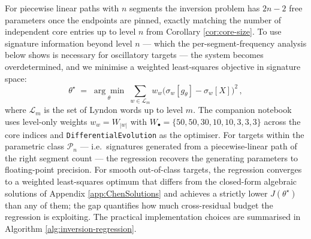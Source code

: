 \documentclass[12pt,english]{article}
\theoremstyle{remark}
\begin{document}
For piecewise linear paths with $n$ segments the inversion problem
has $2n-2$ free parameters once the endpoints are pinned, exactly
matching the number of independent core entries up to level $n$ from
Corollary \ref{cor:core-size}. To use signature information beyond
level $n$ --- which the per-segment-frequency analysis below shows
is necessary for oscillatory targets --- the system becomes overdetermined,
and we minimise a weighted least-squares objective in signature space:
\begin{equation}
\theta^{\star}\;=\;\underset{\theta}{\arg\min}\;\sum_{w\in\mathcal{L}_{m}}w_{w}\bigl(\sigma_{w}[g_{\theta}]-\sigma_{w}[X]\bigr)^{2}\,,\label{eq:weighted-regression}
\end{equation}
where $\mathcal{L}_{m}$ is the set of Lyndon words up to level $m$.
The companion notebook uses level-only weights $w_{w}=W_{|w|}$ with
$W_{\bullet}=\{50,50,30,10,10,3,3,3\}$ across the core indices and
\texttt{DifferentialEvolution} as the optimiser. For targets within
the parametric class $\mathcal{P}_{n}$ --- i.e.\ signatures generated
from a piecewise-linear path of the right segment count --- the regression
recovers the generating parameters to floating-point precision. For
smooth out-of-class targets, the regression converges to a weighted
least-squares optimum that differs from the closed-form algebraic
solutions of Appendix \ref{app:ChenSolutions} and achieves a strictly
lower $J(\theta^{\star})$ than any of them; the gap quantifies how
much cross-residual budget the regression is exploiting. The practical
implementation choices are summarised in Algorithm \ref{alg:inversion-regression}.
\end{document}
